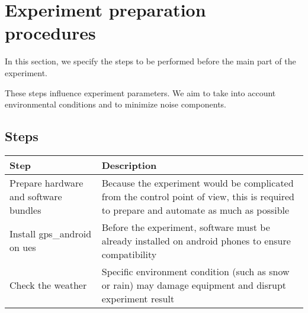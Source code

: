 \section{Experiment preparation procedures}\label{experiment-preparation-procedures}

In this section, we specify the steps to be performed before the main
part of the experiment.

These steps influence experiment parameters. We aim to take into account
environmental conditions and to minimize noise components.

\subsection{Steps}\label{steps}

\begin{longtable}[]{@{}ll@{}}
\toprule
\begin{minipage}[b]{0.2\columnwidth}\raggedright
Step\strut
\end{minipage} & \begin{minipage}[b]{0.7\columnwidth}\raggedright
Description\strut
\end{minipage}\tabularnewline
\midrule
\endhead
\begin{minipage}[t]{0.2\columnwidth}\raggedright
Prepare hardware and software bundles\strut
\end{minipage} & \begin{minipage}[t]{0.7\columnwidth}\raggedright
Because the experiment would be complicated from the control point of
view, this is required to prepare and automate as much as possible\strut
\end{minipage}\tabularnewline
\begin{minipage}[t]{0.2\columnwidth}\raggedright
Install \gls{gps_android} on \glspl{ue}\strut
\end{minipage} & \begin{minipage}[t]{0.7\columnwidth}\raggedright
Before the experiment, software must be already installed on \gls{android} phones to
ensure compatibility\strut
\end{minipage}\tabularnewline
\begin{minipage}[t]{0.2\columnwidth}\raggedright
Check the weather\strut
\end{minipage} & \begin{minipage}[t]{0.7\columnwidth}\raggedright
Specific environment condition (such as snow or rain) may damage equipment
and disrupt experiment result\strut
\end{minipage}\tabularnewline

\end{longtable}
